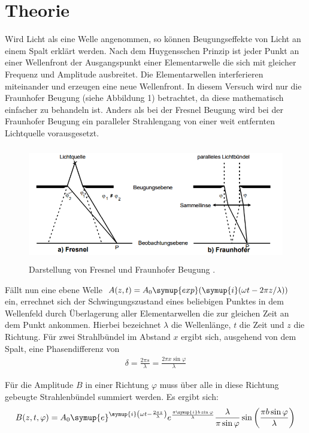 \section{Theorie}
\label{sec:Theorie}

Wird Licht als eine Welle angenommen, so können Beugungseffekte von Licht an einem Spalt erklärt werden. Nach dem Huygensschen
Prinzip ist jeder Punkt an einer Wellenfront der Ausgangspunkt einer Elementarwelle die sich mit gleicher Frequenz und
Amplitude ausbreitet. Die Elementarwellen interferieren miteinander
und erzeugen eine neue Wellenfront. In diesem Versuch wird nur die Fraunhofer Beugung (siehe Abbildung 1) betrachtet, da diese
mathematisch einfacher zu behandeln ist. Anders als bei der Fresnel Beugung wird bei der Fraunhofer Beugung ein
paralleler Strahlengang von einer weit entfernten Lichtquelle vorausgesetzt.


\begin{figure}[H]
  \centering
  \includegraphics[height=5cm]{fraunhofer.PNG}
  \caption{Darstellung von Fresnel und Fraunhofer Beugung \cite{sample}.}
  \label{fig:biegungbild1}
\end{figure}

Fällt nun eine ebene Welle $A(z, t) = A_0 \symup{exp}(\symup{i}(\omega t -2\pi z/\lambda))$ ein, errechnet sich der Schwingungszustand  eines
beliebigen Punktes in dem Wellenfeld durch Überlagerung aller Elementarwellen die zur gleichen Zeit an dem Punkt ankommen. Hierbei bezeichnet
$\lambda$ die Wellenlänge, $t$ die Zeit und $z$ die Richtung.
Für zwei Strahlbündel im Abstand $x$ ergibt sich, ausgehend von dem Spalt, eine Phasendifferenz von
\begin{align}
  \delta = \frac{2\pi s}{\lambda} = \frac{2\pi x \sin{\varphi}}{\lambda}
\end{align}

Für die Amplitude $B$ in einer Richtung $\varphi$ muss über alle in diese Richtung gebeugte Strahlenbündel summiert werden. Es ergibt sich:
\begin{align}
  B(z,t, \varphi) = A_0 \symup{e}^{\symup{i} \left(\omega t - \frac{2\pi z}{\lambda} \right)} e^{\frac{\pi \symup{i} b \sin{\varphi}}{\lambda}} \frac{\lambda}{\pi \sin{\varphi}}
  \sin{\left(\frac{\pi b \sin{\varphi}}{\lambda}\right)}
\end{align}

